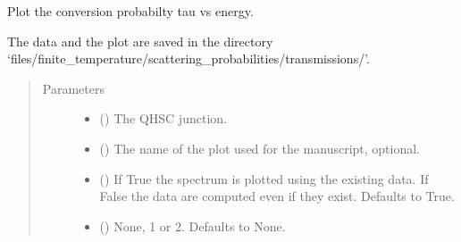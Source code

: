 \documentclass[letterpaper,10pt,english]{sphinxmanual}
\begin{document}

\begin{fulllineitems}
\label{\detokenize{modules:modules.utils.plot_tau_vs_energy}}
\pysigstartsignatures
{}
\pysigstopsignatures
\sphinxAtStartPar
Plot the conversion probabilty tau vs energy.

\sphinxAtStartPar
The data and the plot are saved in the directory
‘files/finite\_temperature/scattering\_probabilities/transmissions/’.
\begin{quote}\begin{description}
\item[{Parameters}] \leavevmode\begin{itemize}
\item {} 
\sphinxAtStartPar
{} () \textendash{} The QH\sphinxhyphen{}SC junction.

\item {} 
\sphinxAtStartPar
{} () \textendash{} The name of the plot used for the manuscript, optional.

\item {} 
\sphinxAtStartPar
{} () \textendash{} If True the spectrum is plotted using the existing data.
If False the data are computed even if they exist. Defaults to True.

\item {} 
\sphinxAtStartPar
{} () \textendash{} None, 1 or 2. Defaults to None.

\end{itemize}

\end{description}\end{quote}

\end{fulllineitems}
\end{document}
